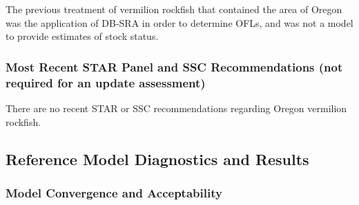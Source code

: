 \documentclass[11pt,
  english,
  a4paper,
]{article}
\begin{document}
\leavevmode\tagmcend\tagstructend


The previous treatment of vermilion rockfish that contained the area of Oregon was the application of DB-SRA in order to determine OFLs, and was not a model to provide estimates of stock status.

\leavevmode\tagmcend\tagstructend\par


\hypertarget{most-recent-star-panel-and-ssc-recommendations-not-required-for-an-update-assessment}{%
\subsubsection{Most Recent STAR Panel and SSC Recommendations (not required for an update assessment)}\label{most-recent-star-panel-and-ssc-recommendations-not-required-for-an-update-assessment}}

\leavevmode\tagmcend\tagstructend


There are no recent STAR or SSC recommendations regarding Oregon vermilion rockfish.

\leavevmode\tagmcend\tagstructend\par


\hypertarget{reference-model-diagnostics-and-results}{%
\subsection{Reference Model Diagnostics and Results}\label{reference-model-diagnostics-and-results}}

\leavevmode\tagmcend\tagstructend


\hypertarget{model-convergence-and-acceptability}{%
\subsubsection{Model Convergence and Acceptability}\label{model-convergence-and-acceptability}}

\leavevmode\tagmcend\tagstructend

\end{document}
